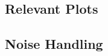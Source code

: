\documentclass[a4paper, 11pt]{report}\usepackage[]{graphicx}\usepackage[]{color}
\numberwithin{figure}{section}
\begin{document}
\begin{appendices}
\chapter{Relevant Plots}
\section{Noise Handling}
\end{appendices}
\end{document}
